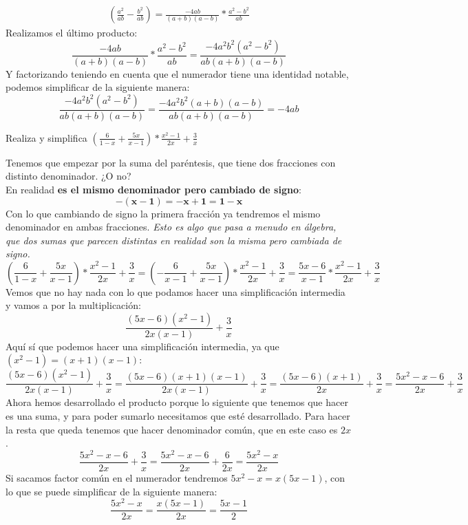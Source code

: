 \documentclass[a4paper,11pt,answers]{exam}
\begin{document}
\begin{questions}
\begin{solution}
\begin{gather*}
      \left(\frac{a^2}{ab} - \frac{b^2}{ab}\right) =
      \frac{-4ab}{(a+b)(a-b)}*\frac{a^2-b^2}{ab}
    \end{gather*}
    Realizamos el último producto:
    \[\frac{-4ab}{(a+b)(a-b)}*\frac{a^2-b^2}{ab} = \frac{-4a^2b^2(a^2 - b^2)}{ab(a+b)(a-b)}\]
    Y factorizando teniendo en cuenta que el numerador tiene una identidad notable,
    podemos simplificar de la siguiente manera:
    \[\frac{-4a^2b^2(a^2 - b^2)}{ab(a+b)(a-b)} =
      \frac{-4a^2b^2(a+b)(a-b)}{ab(a+b)(a-b)} = -4ab\]
  \end{solution}
\question Realiza y simplifica $\left(\frac{6}{1-x} + \frac{5x}{x-1}\right)*\frac{x^2 - 1}{2x}
  +\frac{3}{x}$
    \begin{solution}
      Tenemos que empezar por la suma del paréntesis, que tiene dos fracciones con distinto denominador. ¿O no?\\
      En realidad \textbf{es el mismo denominador pero cambiado de signo}:
      \[\boldsymbol{-(x-1) = -x + 1 = 1-x}\]
      Con lo que cambiando de signo la primera fracción ya tendremos el mismo denominador en ambas fracciones. \emph{Esto es algo que pasa a menudo en álgebra, que dos sumas que parecen distintas en realidad son la misma pero cambiada de signo.}\\
      \[\left(\frac{6}{1-x} + \frac{5x}{x-1}\right)*\frac{x^2 - 1}{2x} +\frac{3}{x}=
        \left(-\frac{6}{x-1} + \frac{5x}{x-1}\right)*\frac{x^2 - 1}{2x} +\frac{3}{x}=
        \frac{5x-6}{x-1}*\frac{x^2 - 1}{2x} +\frac{3}{x}\]
      Vemos que no hay nada con lo que podamos hacer una simplificación intermedia y vamos
      a por la multiplicación:
      \[\frac{(5x-6)(x^2 - 1)}{2x(x-1)} +\frac{3}{x}\]
      Aquí sí que podemos hacer una simplificación intermedia, ya que $(x^2 - 1) = (x+1)(x-1)$:
      \[\frac{(5x-6)(x^2 - 1)}{2x(x-1)} +\frac{3}{x} = 
        \frac{(5x-6)(x+1)(x-1)}{2x(x-1)} +\frac{3}{x} =
        \frac{(5x-6)(x+1)}{2x} + \frac{3}{x} =
        \frac{5x^2 - x -6}{2x} + \frac{3}{x}\]
      Ahora hemos desarrollado el producto porque lo siguiente que tenemos que hacer es una suma,
      y para poder sumarlo necesitamos que esté desarrollado. Para hacer la resta que queda
      tenemos que hacer denominador común, que en este caso es $2x$.
      \[\frac{5x^2 - x -6}{2x} + \frac{3}{x} =
        \frac{5x^2 - x -6}{2x} + \frac{6}{2x} = \frac{5x^2 - x}{2x}\]
      Si sacamos factor común en el numerador tendremos $5x^2 - x = x(5x-1)$, con lo que se puede
      simplificar de la siguiente manera:
      \[\frac{5x^2 - x}{2x} = \frac{x(5x - 1)}{2x} = \frac{5x - 1}{2}\]

\end{solution}
\end{questions}
\end{document}
